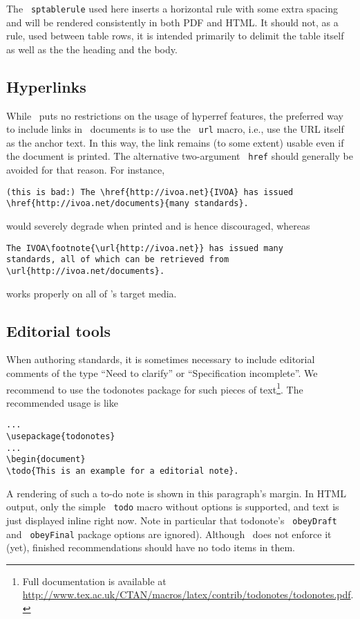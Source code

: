 \documentclass[11pt,a4paper]{ivoa}
\newcommand{\texword}[1]{\texttt{\color{texcolor} #1}}
\begin{document}
The \texword{sptablerule} used here inserts a horizontal rule with some
extra spacing and will be rendered consistently in both PDF and HTML.
It should not, as a rule, used between table rows, it is intended
primarily to delimit the table itself as well as the the heading and the
body.

\subsection{Hyperlinks}

While \ivoatex\ puts no restrictions on the usage of hyperref features,
the preferred way to include links in \ivoatex\ documents is to use the
\texword{url} macro, i.e., use the URL itself as the anchor text.  In
this way, the link remains (to some extent) usable even if the document
is printed.  The alternative two-argument \texword{href} should
generally be avoided for that reason.  For instance,
\begin{lstlisting}
(this is bad:) The \href{http://ivoa.net}{IVOA} has issued
\href{http://ivoa.net/documents}{many standards}.
\end{lstlisting}
would severely degrade when printed and is hence discouraged, whereas
\begin{lstlisting}
The IVOA\footnote{\url{http://ivoa.net}} has issued many 
standards, all of which can be retrieved from 
\url{http://ivoa.net/documents}.
\end{lstlisting}
works properly on all of \ivoatex's target media.

\subsection{Editorial tools}

When authoring standards, it is sometimes necessary to include
editorial comments of the type ``Need to clarify'' or ``Specification
incomplete''.  We recommend to use the todonotes package for such
pieces of text\footnote{Full documentation is available at
\url{http://www.tex.ac.uk/CTAN/macros/latex/contrib/todonotes/todonotes.pdf}.}.
The recommended usage is like
\begin{lstlisting}
...
\usepackage{todonotes}
...
\begin{document}
\todo{This is an example for a editorial note}.
\end{lstlisting}

A rendering of such a to-do note is shown in this paragraph's
margin. In HTML output,
only the simple \texword{todo} macro without options is supported, and
text is just displayed inline right now.  Note in particular that
todonote's \texword{obeyDraft} and \texword{obeyFinal} package options
are ignored).  Although \ivoatex\ does not enforce it (yet), finished
recommendations should have no todo items in them.
\end{document}
